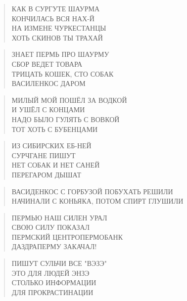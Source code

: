 \poemtitle{***}
\begin{verse}
КАК В СУРГУТЕ ШАУРМА\\
КОНЧИЛАСЬ ВСЯ НАХ-Й\\
НА ИЗМЕНЕ ЧУРКЕСТАНЦЫ\\
ХОТЬ СКИНОВ ТЫ ТРАХАЙ
\end{verse}

\poemtitle{***}
\begin{verse}
ЗНАЕТ ПЕРМЬ ПРО ШАУРМУ\\
СБОР ВЕДЕТ ТОВАРА\\
ТРИЦАТЬ КОШЕК, СТО СОБАК\\
ВАСИЛЕНКОС ДАРОМ
\end{verse}

\poemtitle{***}
\begin{verse}
МИЛЫЙ МОЙ ПОШЁЛ ЗА ВОДКОЙ\\
И УШЁЛ С КОНЦАМИ\\
НАДО БЫЛО ГУЛЯТЬ С ВОВКОЙ\\
ТОТ ХОТЬ С БУБЕНЦАМИ
\end{verse}

\poemtitle{***}
\begin{verse}
ИЗ СИБИРСКИХ ЕБ-НЕЙ\\
СУРЧГАНЕ ПИШУТ\\
НЕТ СОБАК И НЕТ САНЕЙ\\
ПЕРЕГАРОМ ДЫШАТ
\end{verse}

\poemtitle{***}
\begin{verse}
ВАСИДЕНКОС С ГОРБУЗОЙ ПОБУХАТЬ РЕШИЛИ\\
НАЧИНАЛИ С КОНЬЯКА, ПОТОМ СПИРТ ГЛУШИЛИ
\end{verse}

\poemtitle{***}
\begin{verse}
ПЕРМЬЮ НАШ СИЛЕН УРАЛ\\
СВОЮ СИЛУ ПОКАЗАЛ\\
ПЕРМСКИЙ ЦЕНТРОПЕРМОБАНК\\
ДАЗДРАПЕРМУ ЗАКАЧАЛ!
\end{verse}

\poemtitle{***}
\begin{verse}
ПИШУТ СУЛЬЧИ ВСЕ "ВЭЗЭ"\\
ЭТО ДЛЯ ЛЮДЕЙ ЭНЗЭ\\
СТОЛЬКО ИНФОРМАЦИИ\\
ДЛЯ ПРОКРАСТИНАЦИИ
\end{verse}

